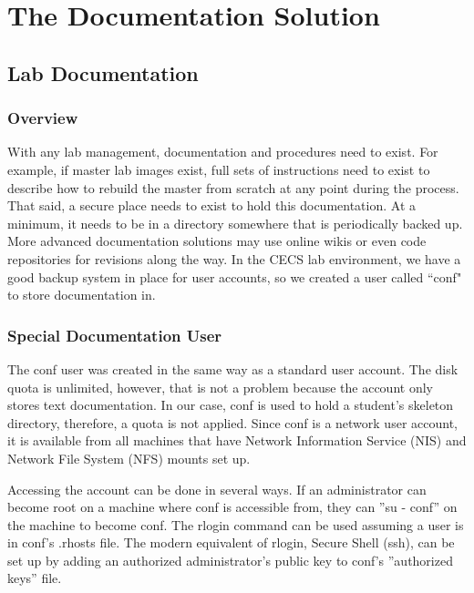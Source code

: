 \chapter{The Documentation Solution} \label{ch:documentation_solution}
\section{Lab Documentation}\label{sec:documentation_solution}
\subsection{Overview}
With any lab management, documentation and procedures need to exist.  For example, if master lab images exist, full sets of instructions need to exist to describe how to rebuild the master from scratch at any point during the process.  That said, a secure place needs to exist to hold this documentation.  At a minimum, it needs to be in a directory somewhere that is periodically backed up.  More advanced documentation solutions may use online wikis or even code repositories for revisions along the way.  In the CECS lab environment, we have a good backup system in place for user accounts, so we created a user called ``conf" to store documentation in.  

\subsection{Special Documentation User}
The conf user was created in the same way as a standard user account.  The disk quota is unlimited, however, that is not a problem because the account only stores text documentation.  In our case, conf is used to hold a student’s skeleton directory, therefore, a quota is not applied.  Since conf is a network user account, it is available from all machines that have Network Information Service (NIS) and Network File System (NFS) mounts set up.  

Accessing the account can be done in several ways.  If an administrator can become root on a machine where conf is accessible from, they can ”su - conf” on the machine to become conf.  The rlogin command can be used assuming a user is in conf’s .rhosts ﬁle.  The modern equivalent of rlogin, Secure Shell (ssh), can be set up by adding an authorized administrator’s public key to conf’s ”authorized keys” file.  

